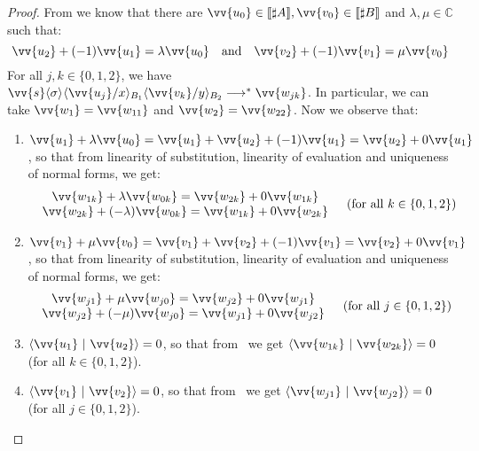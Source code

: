 \documentclass[runningheads,orivec,envcountsame,envcountsect]{llncs}
\newcommand\lra{\longrightarrow}
\newcommand\ansubst[2]{\ensuremath{\langle #1 \rangle_{#2}}}
\def\C{\mathbb{C}}            %
\def\scal#1#2{\langle{#1}~|~{#2}\rangle}
\def\eval{\lra^*}
\def\sem#1{\llbracket#1\rrbracket}
\begin{document}
\begin{proof}
    From  we know that there are $\vv{u_0}\in\sem{\sharp A}, \vv{v_0}\in\sem{\sharp B}$ and $\lambda,\mu\in\C$ such that:
    \[
    \vv{u_2} + (-1) \vv{u_1} = \lambda\vv{u_0}\quad\text{and}\quad\vv{v_2} + (-1) \vv{v_1} = \mu \vv{v_0}
    \]
    For all $j,k\in\{0,1,2\}$, we have $\vv{s}\ansubst{\sigma}{}\ansubst{\vv{u_j}/x}{B_1}\ansubst{\vv{v_k}/y}{B_2}\eval\vv{w_{jk}}$. In particular, we can take $\vv{w_1}=\vv{w_{11}}$ and $\vv{w_2}=\vv{w_{22}}$. Now we observe that:
    \begin{enumerate}
        \item\label{A8:it1} $\vv{u_1}+\lambda\vv{u_0}= \vv{u_1} + \vv{u_2} + (-1) \vv{u_1}= \vv{u_2} + 0\vv{u_1}$, so that from linearity of substitution, linearity of evaluation and uniqueness of normal forms, we get:
        \[
        \begin{array}{c c}
            \begin{array}{c}
                \vv{w_{1k}} + \lambda\vv{w_{0k}} = \vv{w_{2k}} + 0 \vv{w_{1k}}\\
                \vv{w_{2k}} + (-\lambda)\vv{w_{0k}} = \vv{w_{1k}} + 0 \vv{w_{2k}}
            \end{array}&
            (\text{for all }k\in\{0,1,2\})
        \end{array}
        \]
        
        \item\label{A8:it2} $\vv{v_1}+\mu\vv{v_0}= \vv{v_1} + \vv{v_2} + (-1) \vv{v_1}= \vv{v_2} + 0\vv{v_1}$, so that from linearity of substitution, linearity of evaluation and uniqueness of normal forms, we get:
        \[
        \begin{array}{c c}
            \begin{array}{c}
                \vv{w_{j1}} + \mu\vv{w_{j0}} = \vv{w_{j2}} + 0 \vv{w_{j1}}\\
                \vv{w_{j2}} + (-\mu)\vv{w_{j0}} = \vv{w_{j1}} + 0 \vv{w_{j2}}
            \end{array}&
            (\text{for all }j\in\{0,1,2\})
        \end{array}
        \]
        
        \item\label{A8:it3} $\scal{\vv{u_1}}{\vv{u_2}}=0$, so that from ~we get $\scal{\vv{w_{1k}}}{\vv{w_{2k}}}=0$ (for all $k\in\{0,1,2\}$).
        
        \item\label{A8:it4} $\scal{\vv{v_1}}{\vv{v_2}}=0$, so that from ~we get $\scal{\vv{w_{j1}}}{\vv{w_{j2}}}=0$ (for all $j\in\{0,1,2\}$).
    \end{enumerate}


\end{proof}
\end{document}
